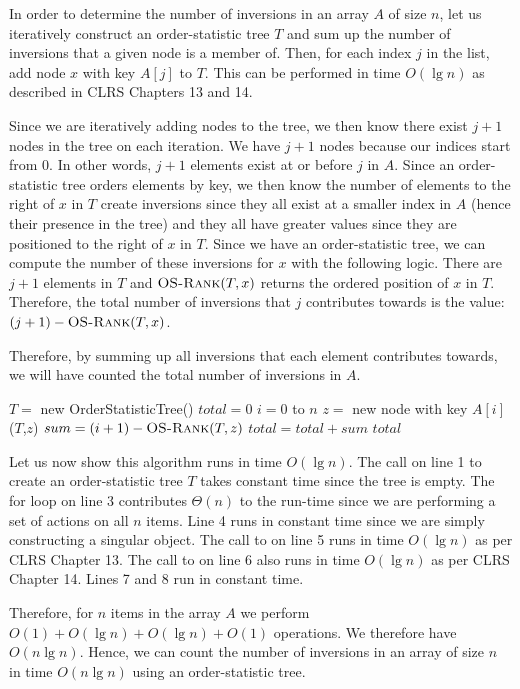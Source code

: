 \documentclass[11pt]{article}
\begin{document}
In order to determine the number of inversions in an array $A$ of size $n$, let us iteratively construct an order-statistic tree $T$ and sum up the number of inversions that a given node is a member of. Then, for each index $j$ in the list, add node $x$ with key $A[j]$ to $T$. This can be performed in time $O(\lg{n})$ as described in CLRS Chapters 13 and 14.

Since we are iteratively adding nodes to the tree, we then know there exist $j + 1$ nodes in the tree on each iteration. We have $j + 1$ nodes because our indices start from 0. In other words, $j + 1$ elements exist at or before $j$ in $A$. Since an order-statistic tree orders elements by key, we then know the number of elements to the right of $x$ in $T$ create inversions since they all exist at a smaller index in $A$ (hence their presence in the tree) and they all have greater values since they are positioned to the right of $x$ in $T$. Since we have an order-statistic tree, we can compute the number of these inversions for $x$ with the following logic. There are $j + 1$ elements in $T$ and $\textnormal{\scshape OS-Rank}(T,x)$ returns the ordered position of $x$ in $T$. Therefore, the total number of inversions that $j$ contributes towards is the value: $(j+1) - \textnormal{\scshape OS-Rank}(T,x)$.

Therefore, by summing up all inversions that each element contributes towards, we will have counted the total number of inversions in $A$.

\begin{codebox}
\li $T = $ new OrderStatisticTree()
\li $total = 0$
\li \For $i=0$ to $n$ \Do
\li     $z = $ new node with key $A[i]$
\li     {}($T$,$z$)
\li     $sum = (i + 1) - \textnormal{\scshape OS-Rank}(T,z)$
\li     $total = total + sum$
    \End
\li \Return $total$
\end{codebox}

Let us now show this algorithm runs in time $O(\lg{n})$. The call on line 1 to create an order-statistic tree $T$ takes constant time since the tree is empty. The for loop on line 3 contributes $\Theta(n)$ to the run-time since we are performing a set of actions on all $n$ items. Line 4 runs in constant time since we are simply constructing a singular object. The call to  on line 5 runs in time $O(\lg{n})$ as per CLRS Chapter 13. The call to  on line 6 also runs in time $O(\lg{n})$ as per CLRS Chapter 14. Lines 7 and 8 run in constant time.

Therefore, for $n$ items in the array $A$ we perform $O(1) + O(\lg{n}) + O(\lg{n}) + O(1)$ operations. We therefore have $O(n\lg{n})$. Hence, we can count the number of inversions in an array of size $n$ in time $O(n\lg{n})$ using an order-statistic tree.
\end{document}
